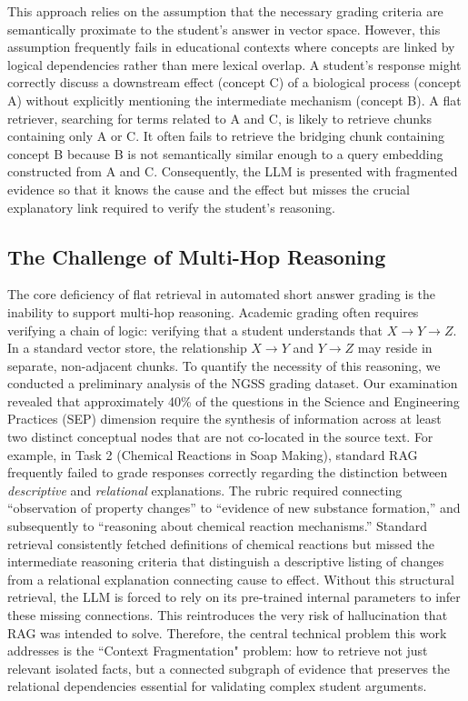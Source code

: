 \documentclass{edm_article}
\begin{document}
This approach relies on the assumption that the necessary grading criteria are semantically proximate to the student's answer in vector space. However, this assumption frequently fails in educational contexts where concepts are linked by logical dependencies rather than mere lexical overlap. A student's response might correctly discuss a downstream effect (concept C) of a biological process (concept A) without explicitly mentioning the intermediate mechanism (concept B). A flat retriever, searching for terms related to A and C, is likely to retrieve chunks containing only A or C. It often fails to retrieve the bridging chunk containing concept B because B is not semantically similar enough to a query embedding constructed from A and C. Consequently, the LLM is presented with fragmented evidence so that it knows the cause and the effect but misses the crucial explanatory link required to verify the student's reasoning.

\subsection{The Challenge of Multi-Hop Reasoning}
The core deficiency of flat retrieval in automated short answer grading is the inability to support multi-hop reasoning. Academic grading often requires verifying a chain of logic: verifying that a student understands that $X \rightarrow Y \rightarrow Z$. In a standard vector store, the relationship $X \rightarrow Y$ and $Y \rightarrow Z$ may reside in separate, non-adjacent chunks. 
To quantify the necessity of this reasoning, we conducted a preliminary analysis of the NGSS grading dataset. Our examination revealed that approximately 40\% of the questions in the Science and Engineering Practices (SEP) dimension require the synthesis of information across at least two distinct conceptual nodes that are not co-located in the source text. For example, in Task 2 (Chemical Reactions in Soap Making), standard RAG frequently failed to grade responses correctly regarding the distinction between \textit{descriptive} and \textit{relational} explanations. The rubric required connecting ``observation of property changes'' to ``evidence of new substance formation,'' and subsequently to ``reasoning about chemical reaction mechanisms.'' Standard retrieval consistently fetched definitions of chemical reactions but missed the intermediate reasoning criteria that distinguish a descriptive listing of changes from a relational explanation connecting cause to effect.
Without this structural retrieval, the LLM is forced to rely on its pre-trained internal parameters to infer these missing connections. This reintroduces the very risk of hallucination that RAG was intended to solve. 
Therefore, the central technical problem this work addresses is the ``Context Fragmentation" problem: how to retrieve not just relevant isolated facts, but a connected subgraph of evidence that preserves the relational dependencies essential for validating complex student arguments.
\end{document}

